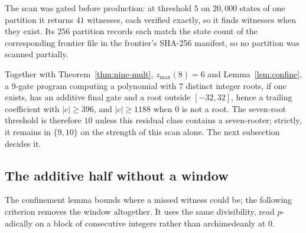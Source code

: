 \documentclass[11pt]{article}
\theoremstyle{definition}
\theoremstyle{remark}
\newcommand{\zmax}{z_{\max}}
\begin{document}
The scan was gated before production: at threshold $5$ on $20{,}000$ states of one
partition it returns $41$ witnesses, each verified exactly, so it finds witnesses
when they exist. Its $256$ partition records each match the state count of the
corresponding frontier file in the frontier's SHA-256 manifest, so no partition was
scanned partially.

Together with Theorem~\ref{thm:nine-mult}, $\zmax(8) = 6$ and
Lemma~\ref{lem:confine}, a $9$-gate program computing a polynomial with $7$
distinct integer roots, if one exists, has an additive final gate and a root
outside $[-32,32]$, hence a trailing coefficient with $|c| \ge 396$, and
$|c| \ge 1188$ when $0$ is not a root. The seven-root threshold is therefore $10$
unless this residual class contains a seven-rooter; strictly, it remains in
$\{9, 10\}$ on the strength of this scan alone. The next subsection decides it.

\subsection{The additive half without a window}\label{sec:seven:free}

The confinement lemma bounds where a missed witness could be; the following
criterion removes the window altogether. It uses the same divisibility, read
$p$-adically on a block of consecutive integers rather than archimedeanly at $0$.
\end{document}

